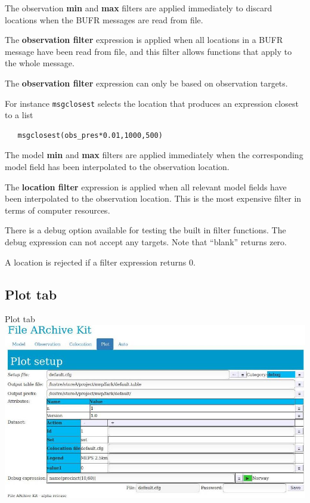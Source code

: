 \documentclass[letterpaper,10pt,twoside,twocolumn,openany]{book}
\begin{document}
The observation {\bf min} and {\bf max} filters are applied immediately to discard locations
when the BUFR messages are read from file. 

The {\bf observation filter} expression is applied when all locations in a BUFR message have been read from file,
and this filter allows functions that apply to the whole message. 
\begin{quotebox}
  The {\bf observation filter} expression can only be based on observation targets.
\end{quotebox}
For instance \lstinline!msgclosest!
selects the location that produces an expression closest to a list
\begin{lstlisting}
   msgclosest(obs_pres*0.01,1000,500)
\end{lstlisting}

The model {\bf min} and {\bf max} filters are applied immediately when the corresponding 
model field has been interpolated to the observation location.

The {\bf location filter} expression is applied when all relevant model fields have been interpolated to the observation location.
This is the most expensive filter in terms of computer resources.

There is a debug option available for testing the built in filter functions.
The debug expression can not accept any targets.
Note that ``blank'' returns zero.

\begin{quotebox}
  A location is rejected if a filter expression returns 0.
\end{quotebox}


\subsection{Plot tab}

\begin{paperbox}{Plot tab}
  \includegraphics[width=\columnwidth]{fark_plot.jpg}
\end{paperbox}
\end{document}
